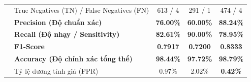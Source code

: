 \documentclass[11pt,a4paper]{article}
\begin{document}
\begin{table}[H]
{\begin{tabular}{llccc}
& True Negatives (TN) / False Negatives (FN) & 613 / 4 & 291 / 1 & 474 / 4 \\
& \textbf{Precision (Độ chuẩn xác)} & \textbf{76.00\%} & \textbf{60.00\%} & \textbf{88.24\%} \\
& \textbf{Recall (Độ nhạy / Sensitivity)} & \textbf{82.61\%} & \textbf{90.00\%} & \textbf{78.95\%} \\
& \textbf{F1-Score} & \textbf{0.7917} & \textbf{0.7200} & \textbf{0.8333} \\
& \textbf{Accuracy (Độ chính xác tổng thể)} & \textbf{98.44\%} & \textbf{97.72\%} & \textbf{98.79\%} \\
& Tỷ lệ dương tính giả (FPR) & 0.97\% & 2.02\% & \textbf{0.42\%} \\
\bottomrule
\end{tabular}%
}
\end{table}
\end{document}
